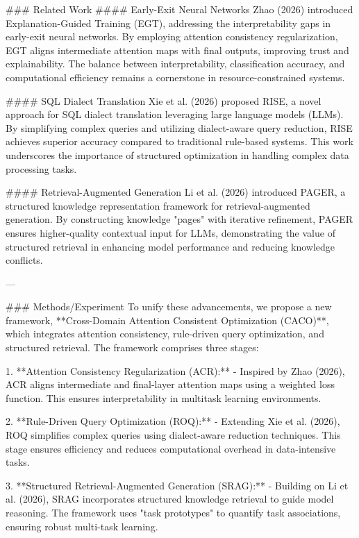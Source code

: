 ### Related Work
#### Early-Exit Neural Networks
Zhao (2026) introduced Explanation-Guided Training (EGT), addressing the interpretability gaps in early-exit neural networks. By employing attention consistency regularization, EGT aligns intermediate attention maps with final outputs, improving trust and explainability. The balance between interpretability, classification accuracy, and computational efficiency remains a cornerstone in resource-constrained systems.

#### SQL Dialect Translation
Xie et al. (2026) proposed RISE, a novel approach for SQL dialect translation leveraging large language models (LLMs). By simplifying complex queries and utilizing dialect-aware query reduction, RISE achieves superior accuracy compared to traditional rule-based systems. This work underscores the importance of structured optimization in handling complex data processing tasks.

#### Retrieval-Augmented Generation
Li et al. (2026) introduced PAGER, a structured knowledge representation framework for retrieval-augmented generation. By constructing knowledge "pages" with iterative refinement, PAGER ensures higher-quality contextual input for LLMs, demonstrating the value of structured retrieval in enhancing model performance and reducing knowledge conflicts.

---

### Methods/Experiment
To unify these advancements, we propose a new framework, **Cross-Domain Attention Consistent Optimization (CACO)**, which integrates attention consistency, rule-driven query optimization, and structured retrieval. The framework comprises three stages:

1. **Attention Consistency Regularization (ACR):**
   - Inspired by Zhao (2026), ACR aligns intermediate and final-layer attention maps using a weighted loss function. This ensures interpretability in multitask learning environments.

2. **Rule-Driven Query Optimization (ROQ):**
   - Extending Xie et al. (2026), ROQ simplifies complex queries using dialect-aware reduction techniques. This stage ensures efficiency and reduces computational overhead in data-intensive tasks.

3. **Structured Retrieval-Augmented Generation (SRAG):**
   - Building on Li et al. (2026), SRAG incorporates structured knowledge retrieval to guide model reasoning. The framework uses "task prototypes" to quantify task associations, ensuring robust multi-task learning.


